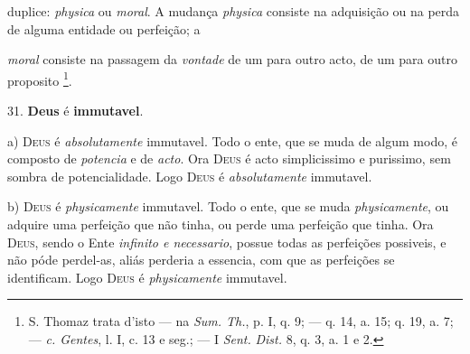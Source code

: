  duplice: \emph{physica} ou \emph{moral}. A mudança \emph{physica} consiste na adquisição ou na perda de alguma entidade ou perfeição; a

 \emph{moral} consiste na passagem da \emph{vontade} de um para outro acto, de um para outro proposito \footnote{S. Thomaz trata d'isto --- na \emph{Sum. Th.}, p. I, q. 9; --- q. 14, a. 15; q. 19, a. 7; --- \emph{c. Gentes}, l. I, c. 13 e seg.; --- I \emph{Sent.} \emph{Dist.} 8, q. 3, a. 1 e 2.}.

31. \textbf{Deus} é \textbf{immutavel}.

a) \textsc{Deus} é \emph{absolutamente} immutavel. Todo o ente, que se muda de algum modo, é composto de \emph{potencia} e de \emph{acto}. Ora \textsc{Deus} é acto simplicissimo e purissimo, sem sombra de potencialidade. Logo \textsc{Deus} é \emph{absolutamente} immutavel.

b) \textsc{Deus} é \emph{physicamente} immutavel. Todo o ente, que se muda \emph{physicamente}, ou adquire uma perfeição que não tinha, ou perde uma perfeição que tinha. Ora \textsc{Deus}, sendo o Ente \emph{infinito e necessario}, possue todas as perfeições possiveis, e não póde perdel-as, aliás perderia a essencia, com que as perfeições se identificam. Logo \textsc{Deus} é \emph{physicamente} immutavel.

